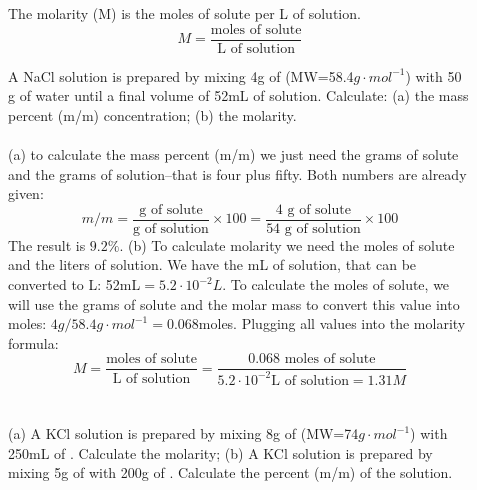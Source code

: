 \documentclass[main.tex]{subfiles}
\begin{document}
\begin{description}
\item[] The molarity (M) is the moles of solute per L of solution.
\begin{equation*}
\boxed{ M=\frac{\text{moles of solute}}{\text{L of solution}}}   
\end{equation*}
\begin{example} %
A NaCl solution is prepared by mixing 4g of  (MW=58.4$g\cdot mol^{-1}$) with 50 g of water until a final volume of 52mL of solution. Calculate:  (a) the mass percent (m/m) concentration; (b) the molarity.
\\
\\
(a) to calculate the mass percent (m/m) we just need the grams of solute and the grams of solution--that is four plus fifty. Both numbers are already given:
\begin{equation*}
 m/m=\frac{\text{g of solute}}{\text{g of solution}}\times 100 =\frac{\text{4 g of solute}}{\text{54 g of solution}}\times 100
\end{equation*}
The result is $9.2\%$. (b) To calculate molarity we need the moles of solute and the liters of solution. We have the mL of solution, that can be converted to L: 52mL$=5.2\cdot 10^{-2}L$. To calculate the moles of solute, we will use the grams of solute and the molar mass to convert this value into moles: $4g/58.4 g\cdot mol^{-1}=$0.068moles. Plugging all values into the molarity formula:
\begin{equation*}
M=\frac{\text{moles of solute}}{\text{L of solution}}
=\frac{\text{0.068 moles of solute}}{5.2\cdot 10^{-2}\text{L of solution}=1.31M}
\end{equation*}
\\
\faDiamond\ \\
(a) A KCl solution is prepared by mixing 8g of  (MW=74$g\cdot mol^{-1}$) with 250mL of . Calculate the molarity; (b) A KCl solution is prepared by mixing 5g of  with 200g of . Calculate the percent (m/m) of the solution.
\\
\end{example}%


\end{description}
\end{document}
